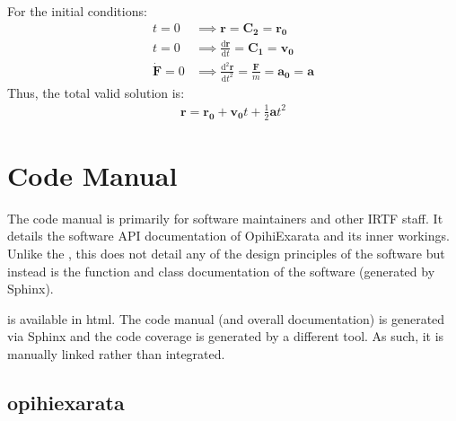\documentclass[letterpaper,11pt,english]{sphinxmanual}
\begin{document}
\sphinxAtStartPar
For the initial conditions:
\begin{equation*}
\begin{split}t = 0 &\implies \mathbf{r} = \mathbf{C_2} = \mathbf{r_0} \\
t = 0 &\implies \frac{\mathrm{d}\mathbf{r}}{\mathrm{d}t} = \mathbf{C_1} = \mathbf{v_0} \\
\dot{\mathbf{F}} = 0 &\implies \frac{\mathrm{d}^2\mathbf{r}}{\mathrm{d}t^2} = \frac{\mathbf{F}}{m} = \mathbf{a_0} = \mathbf{a}\end{split}
\end{equation*}
\sphinxAtStartPar
Thus, the total valid solution is:
\begin{equation*}
\begin{split}\mathbf{r} = \mathbf{r_0} + \mathbf{v_0} t + \frac{1}{2} \mathbf{a} t^2\end{split}
\end{equation*}

\chapter{Code Manual}
\label{\detokenize{index:code-manual}}\label{\detokenize{index:home-code-manual}}
\sphinxAtStartPar
The code manual is primarily for software maintainers and other IRTF staff. It
details the software API documentation of OpihiExarata and its inner workings.
Unlike the {\hyperref[\detokenize{index:home-technical-manual}]{}}, this does not detail
any of the design principles of the software but instead is the function and
class documentation of the software (generated by Sphinx).

\sphinxAtStartPar
{}%
\begin{footnote}[46]\sphinxAtStartFootnote
{}
%
\end{footnote} is available in html. The code manual (and overall
documentation) is generated via Sphinx and the code coverage is generated by
a different tool. As such, it is manually linked rather than integrated.

\sphinxstepscope


\section{opihiexarata}
\label{\detokenize{code/modules:opihiexarata}}\label{\detokenize{code/modules::doc}}
\sphinxstepscope
\end{document}
